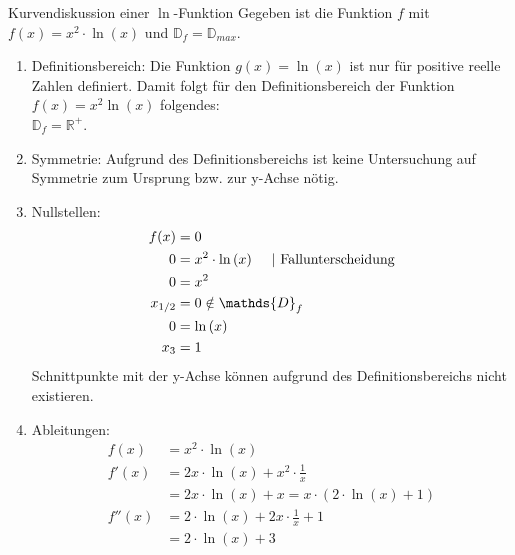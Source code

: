  \begin{bsp}{Kurvendiskussion einer $\ln$-Funktion}{ }
Gegeben ist die Funktion $f$ mit $f(x) = x^2\cdot \ln{(x)}$ und $\mathds{D}_f = \mathds{D}_{max}$.
\begin{enumerate}
    \item Definitionsbereich: Die Funktion $g(x) = \ln{(x)}$ ist nur für positive reelle Zahlen definiert. Damit folgt für den Definitionsbereich der Funktion $f(x) = x^2\ln{(x)}$ folgendes: \\ $\mathds{D}_f = \mathds{R}^+$.
    \item Symmetrie: Aufgrund des Definitionsbereichs ist keine Untersuchung auf Symmetrie zum Ursprung bzw. zur y-Achse nötig.
    \item Nullstellen: 
        \begin{equation*}
            \begin{split}
                f(x) &=0\\
                0&= x^2\cdot \ln{(x)}\hspace{0.5cm} | \text{ Fallunterscheidung}\\
                0&= x^2\\
                x_{1/2} &= 0 \notin \mathds{D}_f\\
                0&= \ln{(x)}\\
                x_3&= 1
            \end{split}
        \end{equation*}
Schnittpunkte mit der y-Achse können aufgrund des Definitionsbereichs nicht existieren.
\item Ableitungen:
        \begin{equation*}
            \begin{split}
                f(x) &=x^2\cdot \ln{(x)}\\
                f'(x)&= 2x\cdot \ln{(x)} + x^2 \cdot \frac{1}{x}\\
                &=2x\cdot \ln{(x)} + x = x\cdot (2\cdot \ln{(x)} +1)\\
                f''(x) &= 2\cdot \ln{(x)} + 2x\cdot \frac{1}{x} +1\\
                &=2\cdot \ln{(x)} + 3
            \end{split}
        \end{equation*}


\end{enumerate}
\end{bsp}

